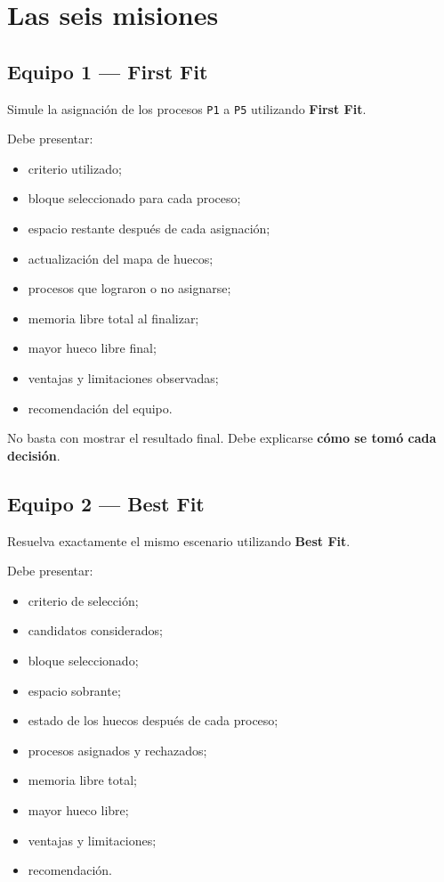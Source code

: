 \documentclass[
  spanish,
  letterpaper,
]{scrbook}
\providecommand{\tightlist}{%
  \setlength{\itemsep}{0pt}\setlength{\parskip}{0pt}}
\begin{document}

\chapter{Las seis misiones}\label{las-seis-misiones}

\section{Equipo 1 --- First Fit}\label{equipo-1-first-fit}

Simule la asignación de los procesos \texttt{P1} a \texttt{P5}
utilizando \textbf{First Fit}.

Debe presentar:

\begin{itemize}
\tightlist
\item
  criterio utilizado;
\item
  bloque seleccionado para cada proceso;
\item
  espacio restante después de cada asignación;
\item
  actualización del mapa de huecos;
\item
  procesos que lograron o no asignarse;
\item
  memoria libre total al finalizar;
\item
  mayor hueco libre final;
\item
  ventajas y limitaciones observadas;
\item
  recomendación del equipo.
\end{itemize}

No basta con mostrar el resultado final. Debe explicarse \textbf{cómo se
tomó cada decisión}.

\section{Equipo 2 --- Best Fit}\label{equipo-2-best-fit}

Resuelva exactamente el mismo escenario utilizando \textbf{Best Fit}.

Debe presentar:

\begin{itemize}
\tightlist
\item
  criterio de selección;
\item
  candidatos considerados;
\item
  bloque seleccionado;
\item
  espacio sobrante;
\item
  estado de los huecos después de cada proceso;
\item
  procesos asignados y rechazados;
\item
  memoria libre total;
\item
  mayor hueco libre;
\item
  ventajas y limitaciones;
\item
  recomendación.
\end{itemize}
\end{document}
